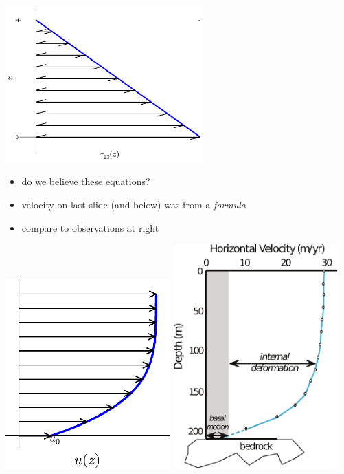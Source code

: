 \documentclass[titlepage,letterpaper,final,11pt]{scrartcl}
\begin{document}
\begin{center}
\includegraphics[width=3.0in]{slabshear}
\end{center}


\begin{itemize}
\item do we believe these equations?
\item velocity on last slide (and below) was from a \emph{formula}
\item compare to observations at right
\end{itemize}


\begin{center}
\includegraphics[width=2.5in]{slabvel}
\quad
\includegraphics[width=2.5in]{athabasca_deform}
\end{center}
\end{document}

